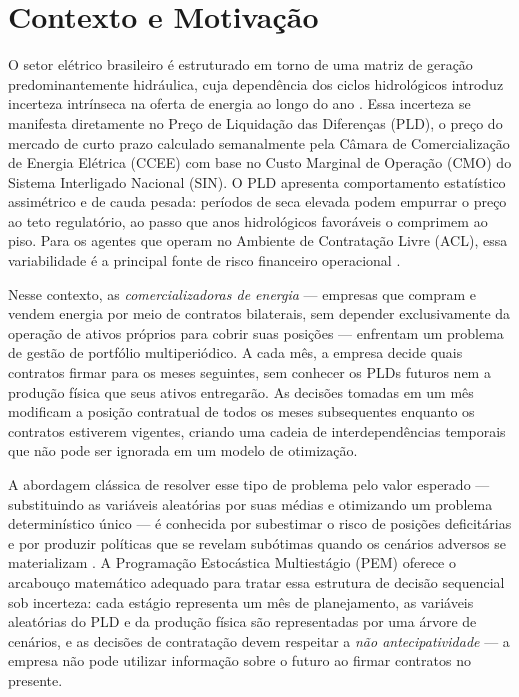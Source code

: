\section{Contexto e Motivação}
\label{sec:contexto}

O setor elétrico brasileiro é estruturado em torno de uma matriz de geração predominantemente hidráulica, cuja dependência dos ciclos hidrológicos introduz incerteza intrínseca na oferta de energia ao longo do ano \cite{epe2025ben}. Essa incerteza se manifesta diretamente no Preço de Liquidação das Diferenças (PLD), o preço do mercado de curto prazo calculado semanalmente pela Câmara de Comercialização de Energia Elétrica (CCEE) com base no Custo Marginal de Operação (CMO) do Sistema Interligado Nacional (SIN). O PLD apresenta comportamento estatístico assimétrico e de cauda pesada: períodos de seca elevada podem empurrar o preço ao teto regulatório, ao passo que anos hidrológicos favoráveis o comprimem ao piso. Para os agentes que operam no Ambiente de Contratação Livre (ACL), essa variabilidade é a principal fonte de risco financeiro operacional \cite{guerreiro2017}.

Nesse contexto, as \emph{comercializadoras de energia} --- empresas que compram e vendem energia por meio de contratos bilaterais, sem depender exclusivamente da operação de ativos próprios para cobrir suas posições --- enfrentam um problema de gestão de portfólio multiperiódico. A cada mês, a empresa decide quais contratos firmar para os meses seguintes, sem conhecer os PLDs futuros nem a produção física que seus ativos entregarão. As decisões tomadas em um mês modificam a posição contratual de todos os meses subsequentes enquanto os contratos estiverem vigentes, criando uma cadeia de interdependências temporais que não pode ser ignorada em um modelo de otimização.

A abordagem clássica de resolver esse tipo de problema pelo valor esperado --- substituindo as variáveis aleatórias por suas médias e otimizando um problema determinístico único --- é conhecida por subestimar o risco de posições deficitárias e por produzir políticas que se revelam subótimas quando os cenários adversos se materializam \cite{birge2011}. A Programação Estocástica Multiestágio (PEM) oferece o arcabouço matemático adequado para tratar essa estrutura de decisão sequencial sob incerteza: cada estágio representa um mês de planejamento, as variáveis aleatórias do PLD e da produção física são representadas por uma árvore de cenários, e as decisões de contratação devem respeitar a \emph{não antecipatividade} --- a empresa não pode utilizar informação sobre o futuro ao firmar contratos no presente.

